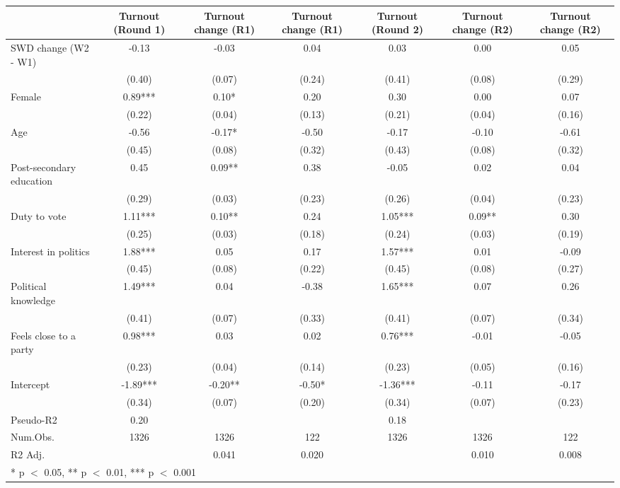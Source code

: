\begin{table}
\centering
\begin{tabular}[t]{lcccccc}
\toprule
  & Turnout (Round 1) & Turnout change (R1) & Turnout change (R1)  & Turnout (Round 2) & Turnout change (R2) & Turnout change (R2) \\
\midrule
SWD change (W2 - W1) & -0.13 & -0.03 & 0.04 & 0.03 & 0.00 & 0.05\\
 & (0.40) & (0.07) & (0.24) & (0.41) & (0.08) & (0.29)\\
Female & 0.89*** & 0.10* & 0.20 & 0.30 & 0.00 & 0.07\\
 & (0.22) & (0.04) & (0.13) & (0.21) & (0.04) & (0.16)\\
Age & -0.56 & -0.17* & -0.50 & -0.17 & -0.10 & -0.61\\
 & (0.45) & (0.08) & (0.32) & (0.43) & (0.08) & (0.32)\\
Post-secondary education & 0.45 & 0.09** & 0.38 & -0.05 & 0.02 & 0.04\\
 & (0.29) & (0.03) & (0.23) & (0.26) & (0.04) & (0.23)\\
Duty to vote & 1.11*** & 0.10** & 0.24 & 1.05*** & 0.09** & 0.30\\
 & (0.25) & (0.03) & (0.18) & (0.24) & (0.03) & (0.19)\\
Interest in politics & 1.88*** & 0.05 & 0.17 & 1.57*** & 0.01 & -0.09\\
 & (0.45) & (0.08) & (0.22) & (0.45) & (0.08) & (0.27)\\
Political knowledge & 1.49*** & 0.04 & -0.38 & 1.65*** & 0.07 & 0.26\\
 & (0.41) & (0.07) & (0.33) & (0.41) & (0.07) & (0.34)\\
Feels close to a party & 0.98*** & 0.03 & 0.02 & 0.76*** & -0.01 & -0.05\\
 & (0.23) & (0.04) & (0.14) & (0.23) & (0.05) & (0.16)\\
Intercept & -1.89*** & -0.20** & -0.50* & -1.36*** & -0.11 & -0.17\\
 & (0.34) & (0.07) & (0.20) & (0.34) & (0.07) & (0.23)\\
\midrule
Pseudo-R2 & 0.20 &  &  & 0.18 &  & \\
Num.Obs. & 1326 & 1326 & 122 & 1326 & 1326 & 122\\
R2 Adj. &  & 0.041 & 0.020 &  & 0.010 & 0.008\\
\bottomrule
\multicolumn{7}{l}{\rule{0pt}{1em}* p $<$ 0.05, ** p $<$ 0.01, *** p $<$ 0.001}\\
\end{tabular}
\end{table}
